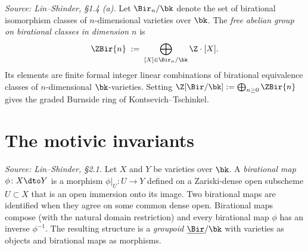 \begin{definition}
  \label{def:burnside-ring}
  \textit{Source: Lin--Shinder, §1.4 (a).}
  Let \(\Bir_n/\bk\) denote the set of birational isomorphism classes of
  \(n\)-dimensional varieties over \(\bk\).  The \emph{free abelian group on
  birational classes in dimension \(n\)} is
  \[
    \ZBir{n} \;:=\; \bigoplus_{[X] \in \Bir_n/\bk} \Z \cdot [X].
  \]
  Its elements are finite formal integer linear combinations of birational
  equivalence classes of \(n\)-dimensional \(\bk\)-varieties.  Setting
  \(\Z[\Bir/\bk] := \bigoplus_{n \geq 0} \ZBir{n}\) gives the graded Burnside ring
  of Kontsevich--Tschinkel.
\end{definition}

\section{The motivic invariants}


\begin{definition}
  \label{def:birational-map}
  \textit{Source: Lin--Shinder, §2.1.}
  Let \(X\) and \(Y\) be varieties over \(\bk\).  A \emph{birational map}
  \(\phi \colon X \dto Y\) is a morphism \(\phi|_U \colon U \to Y\) defined on a
  Zariski-dense open subscheme \(U \subset X\) that is an open immersion onto its
  image.  Two birational maps are identified when they agree on some common dense
  open.  Birational maps compose (with the natural domain restriction) and every
  birational map \(\phi\) has an inverse \(\phi^{-1}\).  The resulting structure is
  a \emph{groupoid} \(\underline{\Bir}/\bk\) with varieties as objects and
  birational maps as morphisms.
\end{definition}

